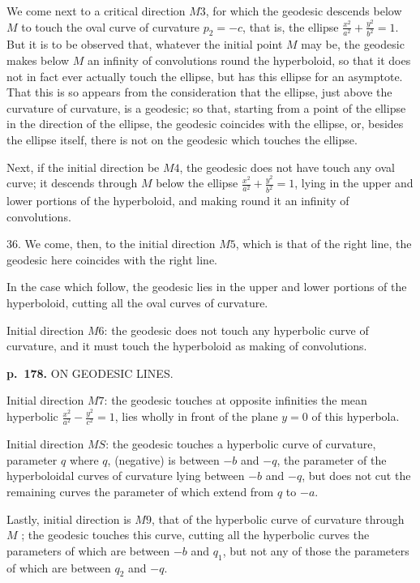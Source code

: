 \documentclass[11pt,a4paper]{article}
\begin{document}
We come next to a critical direction $M3$, for which the geodesic descends below $M$ to touch the oval curve of curvature $p_2 = -c$, that is, the ellipse $\frac{x^2}{a^2} + \frac{y^2}{b^2} = 1$.  But it is to be observed that, whatever the initial point $M$ may be, the geodesic makes below $M$ an infinity of convolutions round the hyperboloid, so that it does not in fact ever actually touch the ellipse, but has this ellipse for an asymptote.  That this is so appears from the consideration that the ellipse, just above the curvature of curvature, is a geodesic; so that, starting from a point of the ellipse in the direction of the ellipse, the geodesic coincides with the ellipse, or, besides the ellipse itself, there is not on the geodesic which touches the ellipse.

Next, if the initial direction be $M4$, the geodesic does not have touch any oval curve; it descends through $M$ below the ellipse $\frac{x^2}{a^2} + \frac{y^2}{b^2} = 1$, lying in the upper and lower portions of the hyperboloid, and making round it an infinity of convolutions.

36. We come, then, to the initial direction $M5$, which is that of the right line, the geodesic here coincides with the right line.

In the case which follow, the geodesic lies in the upper and lower portions of the hyperboloid, cutting all the oval curves of curvature.

Initial direction $M6$: the geodesic does not touch any hyperbolic curve of curvature, and it must touch the hyperboloid as making of convolutions.

\clearpage

\noindent
\textbf{p.~178.}  ON GEODESIC LINES.

Initial direction $M7$: the geodesic touches at opposite infinities the mean hyperbolic $\frac{x^2}{a^2} - \frac{y^2}{c^2} = 1$, lies wholly in front of the plane $y = 0$ of this hyperbola.

Initial direction $MS$: the geodesic touches a hyperbolic curve of curvature, parameter $q$ where $q$, (negative) is between $-b$ and $-q$, the parameter of the hyperboloidal curves of curvature lying between $-b$ and $-q$, but does not cut the remaining curves the parameter of which extend from $q$ to $-a$.

Lastly, initial direction is $M9$, that of the hyperbolic curve of curvature through $M$ ; the geodesic touches this curve, cutting all the hyperbolic curves the parameters of which are between $-b$ and $q_1$, but not any of those the parameters of which are between $q_2$ and $-q$.
\end{document}
